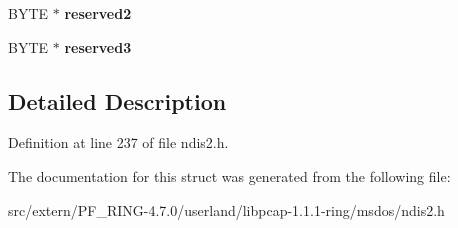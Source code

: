 \begin{DoxyCompactItemize}
\item 
\hypertarget{struct___common_chars_a0216b4a1063ae908fa03f4a5702b45c6}{
BYTE $\ast$ {\bfseries reserved2}}
\label{struct___common_chars_a0216b4a1063ae908fa03f4a5702b45c6}

\item 
\hypertarget{struct___common_chars_a2e5211b37c36567d42fa07c4b07a750f}{
BYTE $\ast$ {\bfseries reserved3}}
\label{struct___common_chars_a2e5211b37c36567d42fa07c4b07a750f}

\end{DoxyCompactItemize}


\subsection{Detailed Description}


Definition at line 237 of file ndis2.h.



The documentation for this struct was generated from the following file:\begin{DoxyCompactItemize}
\item 
src/extern/PF\_\-RING-\/4.7.0/userland/libpcap-\/1.1.1-\/ring/msdos/ndis2.h\end{DoxyCompactItemize}
